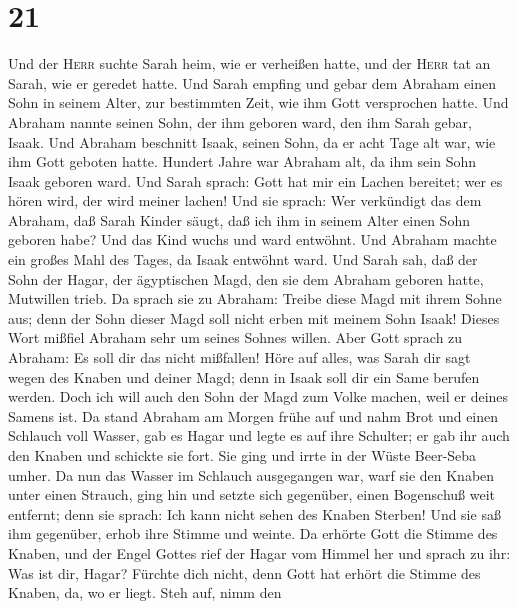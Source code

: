 \hypertarget{section-20}{%
\section{21}\label{section-20}}

 Und der \textsc{Herr} suchte Sarah heim, wie er verheißen
hatte, und der \textsc{Herr} tat an Sarah, wie er geredet hatte.
 Und Sarah empfing und gebar dem Abraham einen Sohn in
seinem Alter, zur bestimmten Zeit, wie ihm Gott versprochen hatte.
 Und Abraham nannte seinen Sohn, der ihm geboren ward, den
ihm Sarah gebar, Isaak.  Und Abraham beschnitt Isaak,
seinen Sohn, da er acht Tage alt war, wie ihm Gott geboten hatte.
 Hundert Jahre war Abraham alt, da ihm sein Sohn Isaak
geboren ward.  Und Sarah sprach: Gott hat mir ein Lachen
bereitet; wer es hören wird, der wird meiner lachen!  Und
sie sprach: Wer verkündigt das dem Abraham, daß Sarah Kinder säugt, daß
ich ihm in seinem Alter einen Sohn geboren habe?  Und das
Kind wuchs und ward entwöhnt. Und Abraham machte ein großes Mahl des
Tages, da Isaak entwöhnt ward.  Und Sarah sah, daß der
Sohn der Hagar, der ägyptischen Magd, den sie dem Abraham geboren hatte,
Mutwillen trieb.  Da sprach sie zu Abraham: Treibe diese
Magd mit ihrem Sohne aus; denn der Sohn dieser Magd soll nicht erben mit
meinem Sohn Isaak!  Dieses Wort mißfiel Abraham sehr um
seines Sohnes willen.  Aber Gott sprach zu Abraham: Es
soll dir das nicht mißfallen! Höre auf alles, was Sarah dir sagt wegen
des Knaben und deiner Magd; denn in Isaak soll dir ein Same berufen
werden.  Doch ich will auch den Sohn der Magd zum Volke
machen, weil er deines Samens ist.  Da stand Abraham am
Morgen frühe auf und nahm Brot und einen Schlauch voll Wasser, gab es
Hagar und legte es auf ihre Schulter; er gab ihr auch den Knaben und
schickte sie fort. Sie ging und irrte in der Wüste Beer-Seba umher.
 Da nun das Wasser im Schlauch ausgegangen war, warf sie
den Knaben unter einen Strauch,  ging hin und setzte sich
gegenüber, einen Bogenschuß weit entfernt; denn sie sprach: Ich kann
nicht sehen des Knaben Sterben! Und sie saß ihm gegenüber, erhob ihre
Stimme und weinte.  Da erhörte Gott die Stimme des
Knaben, und der Engel Gottes rief der Hagar vom Himmel her und sprach zu
ihr: Was ist dir, Hagar? Fürchte dich nicht, denn Gott hat erhört die
Stimme des Knaben, da, wo er liegt.  Steh auf, nimm den
